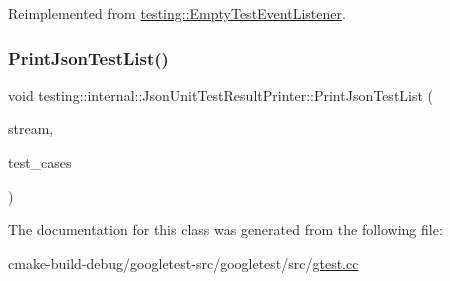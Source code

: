 Reimplemented from \mbox{\hyperlink{classtesting_1_1EmptyTestEventListener_a2253e5a18b3cf7bccd349567a252209d}{testing\+::\+Empty\+Test\+Event\+Listener}}.

\mbox{\label{classtesting_1_1internal_1_1JsonUnitTestResultPrinter_ab9826c030ba8c68c3e58b3ae69db85ea}} 
\subsubsection{\texorpdfstring{PrintJsonTestList()}{PrintJsonTestList()}}
{\footnotesize\ttfamily void testing\+::internal\+::\+Json\+Unit\+Test\+Result\+Printer\+::\+Print\+Json\+Test\+List (\begin{DoxyParamCaption}\item[{\+::std\+::ostream $\ast$}]{stream,  }\item[{const std\+::vector$<$ \mbox{\hyperlink{classtesting_1_1TestCase}{Test\+Case}} $\ast$ $>$ \&}]{test\+\_\+cases }\end{DoxyParamCaption})\hspace{0.3cm}{\ttfamily [static]}}



The documentation for this class was generated from the following file\+:\begin{DoxyCompactItemize}
\item 
cmake-\/build-\/debug/googletest-\/src/googletest/src/\mbox{\hyperlink{gtest_8cc}{gtest.\+cc}}\end{DoxyCompactItemize}
